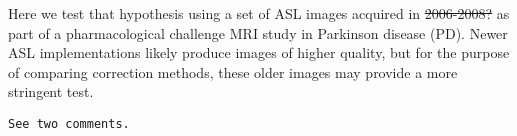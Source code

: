 Here we test that hypothesis using a set of ASL images acquired in \sout{2006-2008?} as part of a pharmacological challenge MRI study in Parkinson disease (PD).\cite{Black_2010} Newer ASL implementations likely produce images of higher quality, but for the purpose of comparing correction methods, these older images may provide a more stringent test.

\verb|See two comments.|